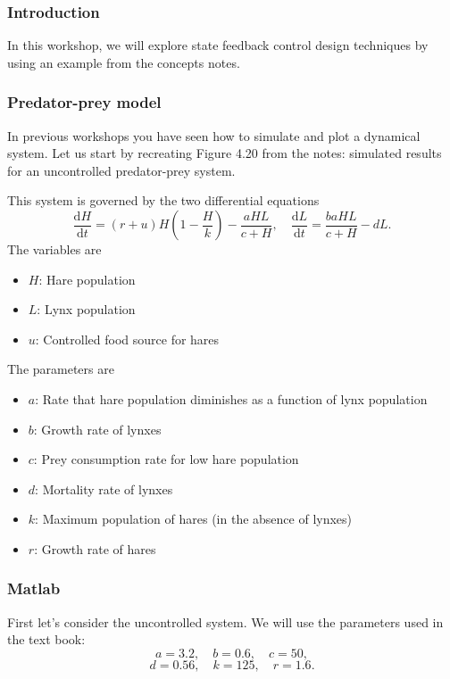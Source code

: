 \documentclass[9pt]{beamer-control}
\begin{document}

\begin{frame}
\frametitle{Introduction}
In this workshop, we will explore state feedback control design techniques by using an example from the concepts notes.
\end{frame}


\begin{frame}[fragile]
\frametitle{Predator-prey model}
In previous workshops you have seen how to simulate and plot a dynamical system. Let us start by recreating Figure 4.20 from the notes: simulated results for an uncontrolled predator-prey system.

This system is governed by the two differential equations
\begin{equation}\frac{\mathrm{d}H}{\mathrm{d}t} = (r+u)H\left(1-\frac{H}{k} \right)-\frac{aHL}{c+H}, \quad \frac{\mathrm{d}L}{\mathrm{d}t} = \frac{baHL}{c+H}-dL.\end{equation}  
The variables are  
\begin{itemize}
	\item  $H$: Hare population 
	\item $L$: Lynx population 
		\item $u$: Controlled food source for hares
		
\end{itemize}
The parameters are
\begin{itemize}
	\item $a$: Rate that hare population diminishes as a function of lynx population
	\item $b$: Growth rate of lynxes
	\item $c$: Prey consumption rate for low hare population
	\item $d$: Mortality rate of lynxes
	\item $k$: Maximum population of hares (in the absence of lynxes)
	\item $r$: Growth rate of hares
\end{itemize}
\end{frame}


\begin{frame}[fragile]
	\frametitle{Matlab}
First let's consider the uncontrolled system. We will use the parameters used in the text book: \\
\vspace{-0.5cm}
\begin{equation}a=3.2, \quad b=0.6, \quad c=50,\end{equation}
\vspace{-0.8cm}
\begin{equation}d=0.56, \quad k=125, \quad r=1.6.\end{equation}


\end{frame}
\end{document}
